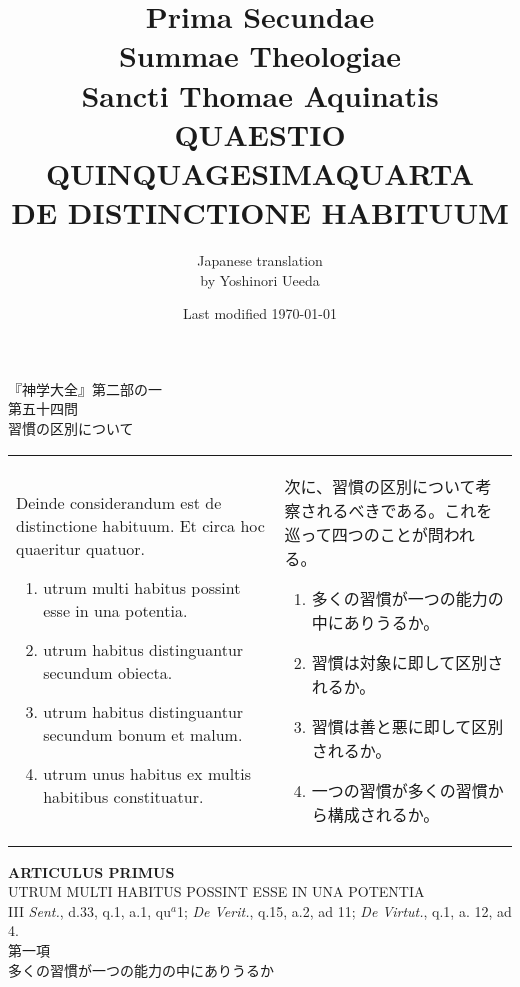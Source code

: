 \documentclass[10pt]{jsarticle}
\title{{\bf Prima Secundae}\\{\HUGE Summae Theologiae}\\Sancti Thomae
Aquinatis\\{\sffamily QUAESTIO QUINQUAGESIMAQUARTA}\\{\bf DE DISTINCTIONE HABITUUM}}
\author{Japanese translation\\by Yoshinori {\sc Ueeda}}
\date{Last modified \today}
\begin{document}
\maketitle
\thispagestyle{empty}
\begin{center}
{\Large 『神学大全』第二部の一\\第五十四問\\習慣の区別について}
\end{center}

\begin{longtable}{p{21em}p{21em}}
Deinde considerandum est de distinctione habituum. Et circa hoc quaeritur quatuor.

\begin{enumerate}
 \item utrum multi habitus possint esse in una potentia.
 \item utrum habitus distinguantur secundum obiecta.
 \item utrum habitus distinguantur secundum bonum et malum.
 \item utrum unus habitus ex multis habitibus constituatur.
\end{enumerate}

&

次に、習慣の区別について考察されるべきである。これを巡って四つのことが問われる。
\begin{enumerate}
 \item 多くの習慣が一つの能力の中にありうるか。
 \item 習慣は対象に即して区別されるか。
 \item 習慣は善と悪に即して区別されるか。
 \item 一つの習慣が多くの習慣から構成されるか。
\end{enumerate}
\end{longtable}
\newpage
{}
\begin{center}
{\Large {\bf ARTICULUS PRIMUS}}\\
{\large UTRUM MULTI HABITUS POSSINT ESSE IN UNA POTENTIA}\\
{\footnotesize III {\itshape Sent.}, d.33, q.1, a.1, qu$^a$1; {\itshape De Verit.}, q.15, a.2, ad 11; {\itshape De Virtut.}, q.1, a. 12, ad 4.}\\
{\Large 第一項\\多くの習慣が一つの能力の中にありうるか}
\end{center}
\end{document}
